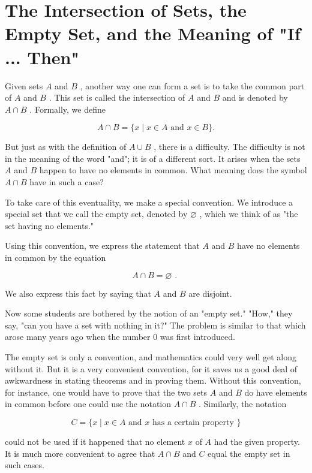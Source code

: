\documentclass[10pt]{article}
\begin{document}
\section*{The Intersection of Sets, the Empty Set, and the Meaning of "If ... Then"}

Given sets \(A\) and \(B\) , another way one can form a set is to take the common part of \(A\) and \(B\) . This set is called the intersection of \(A\) and \(B\) and is denoted by \(A \cap  B\) . Formally, we define

\[
A \cap  B = \{ x \mid  x \in  A\text{ and }x \in  B\} .
\]

But just as with the definition of \(A \cup  B\) , there is a difficulty. The difficulty is not in the meaning of the word "and"; it is of a different sort. It arises when the sets \(A\) and \(B\) happen to have no elements in common. What meaning does the symbol \(A \cap  B\) have in such a case?

To take care of this eventuality, we make a special convention. We introduce a special set that we call the empty set, denoted by \(\varnothing\) , which we think of as "the set having no elements."

Using this convention, we express the statement that \(A\) and \(B\) have no elements in common by the equation

\[
A \cap  B = \varnothing \text{ . }
\]

We also express this fact by saying that \(A\) and \(B\) are disjoint.

Now some students are bothered by the notion of an "empty set." "How," they say, "can you have a set with nothing in it?" The problem is similar to that which arose many years ago when the number 0 was first introduced.

The empty set is only a convention, and mathematics could very well get along without it. But it is a very convenient convention, for it saves us a good deal of awkwardness in stating theorems and in proving them. Without this convention, for instance, one would have to prove that the two sets \(A\) and \(B\) do have elements in common before one could use the notation \(A \cap  B\) . Similarly, the notation

\[
C = \{ x \mid  x \in  A\text{ and }x\text{ has a certain property }\}
\]

could not be used if it happened that no element \(x\) of \(A\) had the given property. It is much more convenient to agree that \(A \cap  B\) and \(C\) equal the empty set in such cases.
\end{document}
